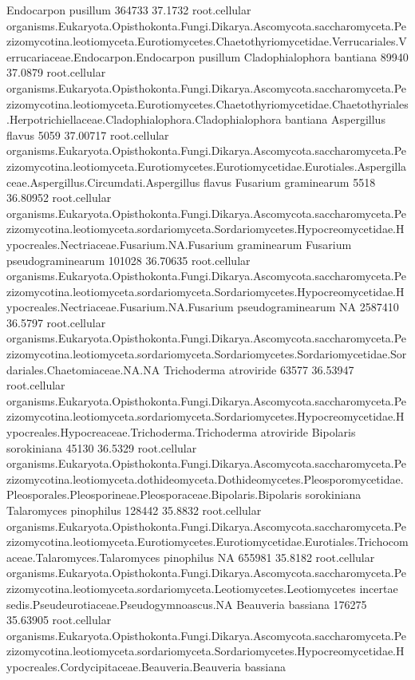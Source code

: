 \documentclass{article}
\begin{document}
\begin{Schunk}
\begin{Soutput}
 Endocarpon pusillum 		 364733 37.1732 	 root.cellular organisms.Eukaryota.Opisthokonta.Fungi.Dikarya.Ascomycota.saccharomyceta.Pezizomycotina.leotiomyceta.Eurotiomycetes.Chaetothyriomycetidae.Verrucariales.Verrucariaceae.Endocarpon.Endocarpon pusillum
 Cladophialophora bantiana 		 89940 37.0879 	 root.cellular organisms.Eukaryota.Opisthokonta.Fungi.Dikarya.Ascomycota.saccharomyceta.Pezizomycotina.leotiomyceta.Eurotiomycetes.Chaetothyriomycetidae.Chaetothyriales.Herpotrichiellaceae.Cladophialophora.Cladophialophora bantiana
 Aspergillus flavus 		 5059 37.00717 	 root.cellular organisms.Eukaryota.Opisthokonta.Fungi.Dikarya.Ascomycota.saccharomyceta.Pezizomycotina.leotiomyceta.Eurotiomycetes.Eurotiomycetidae.Eurotiales.Aspergillaceae.Aspergillus.Circumdati.Aspergillus flavus
 Fusarium graminearum 		 5518 36.80952 	 root.cellular organisms.Eukaryota.Opisthokonta.Fungi.Dikarya.Ascomycota.saccharomyceta.Pezizomycotina.leotiomyceta.sordariomyceta.Sordariomycetes.Hypocreomycetidae.Hypocreales.Nectriaceae.Fusarium.NA.Fusarium graminearum
 Fusarium pseudograminearum 		 101028 36.70635 	 root.cellular organisms.Eukaryota.Opisthokonta.Fungi.Dikarya.Ascomycota.saccharomyceta.Pezizomycotina.leotiomyceta.sordariomyceta.Sordariomycetes.Hypocreomycetidae.Hypocreales.Nectriaceae.Fusarium.NA.Fusarium pseudograminearum
 NA 		 2587410 36.5797 	 root.cellular organisms.Eukaryota.Opisthokonta.Fungi.Dikarya.Ascomycota.saccharomyceta.Pezizomycotina.leotiomyceta.sordariomyceta.Sordariomycetes.Sordariomycetidae.Sordariales.Chaetomiaceae.NA.NA
 Trichoderma atroviride 		 63577 36.53947 	 root.cellular organisms.Eukaryota.Opisthokonta.Fungi.Dikarya.Ascomycota.saccharomyceta.Pezizomycotina.leotiomyceta.sordariomyceta.Sordariomycetes.Hypocreomycetidae.Hypocreales.Hypocreaceae.Trichoderma.Trichoderma atroviride
 Bipolaris sorokiniana 		 45130 36.5329 	 root.cellular organisms.Eukaryota.Opisthokonta.Fungi.Dikarya.Ascomycota.saccharomyceta.Pezizomycotina.leotiomyceta.dothideomyceta.Dothideomycetes.Pleosporomycetidae.Pleosporales.Pleosporineae.Pleosporaceae.Bipolaris.Bipolaris sorokiniana
 Talaromyces pinophilus 		 128442 35.8832 	 root.cellular organisms.Eukaryota.Opisthokonta.Fungi.Dikarya.Ascomycota.saccharomyceta.Pezizomycotina.leotiomyceta.Eurotiomycetes.Eurotiomycetidae.Eurotiales.Trichocomaceae.Talaromyces.Talaromyces pinophilus
 NA 		 655981 35.8182 	 root.cellular organisms.Eukaryota.Opisthokonta.Fungi.Dikarya.Ascomycota.saccharomyceta.Pezizomycotina.leotiomyceta.sordariomyceta.Leotiomycetes.Leotiomycetes incertae sedis.Pseudeurotiaceae.Pseudogymnoascus.NA
 Beauveria bassiana 		 176275 35.63905 	 root.cellular organisms.Eukaryota.Opisthokonta.Fungi.Dikarya.Ascomycota.saccharomyceta.Pezizomycotina.leotiomyceta.sordariomyceta.Sordariomycetes.Hypocreomycetidae.Hypocreales.Cordycipitaceae.Beauveria.Beauveria bassiana

\end{Soutput}
\end{Schunk}
\end{document}
